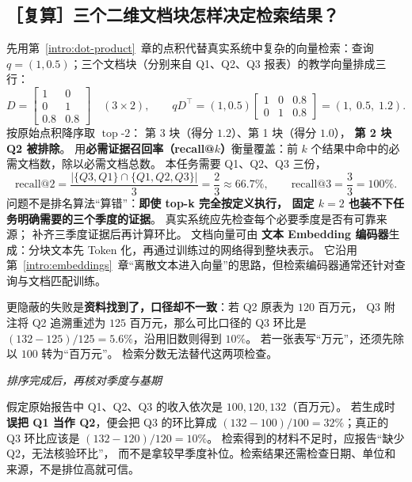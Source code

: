 \subsection{［复算］三个二维文档块怎样决定检索结果？}
\label{concept:vector-retrieval}

先用第~\ref*{intro:dot-product}~章的点积代替真实系统中复杂的向量检索：查询
$q=(1,0.5)$；三个文档块（分别来自 Q1、Q2、Q3 报表）的教学向量排成三行：
\[
D=\begin{bmatrix}1&0\\0&1\\0.8&0.8\end{bmatrix}
\quad(3\times2),\qquad
qD^\top
=(1,0.5)
\begin{bmatrix}1&0&0.8\\0&1&0.8\end{bmatrix}
=\boxed{(1,\;0.5,\;1.2)}.
\]
按原始点积降序取 $\operatorname{top}\text{-}2$：
第 3 块（得分 $1.2$）、第 1 块（得分 $1.0$），
\textbf{第 2 块 Q2 被排除}。
\label{concept:recall-at-k}%
用\textbf{必需证据召回率（recall@$k$）}衡量覆盖：前 $k$ 个结果中命中的必需文档数，除以必需文档总数。
本任务需要 Q1、Q2、Q3 三份，
\[
\text{recall@}2=\frac{|\{Q3,Q1\}\cap\{Q1,Q2,Q3\}|}{3}=\frac23\approx\boxed{66.7\%},\qquad
\text{recall@}3=\frac33=100\%.
\]
问题不是排名算法“算错”：\textbf{即使 top-k 完全按定义执行，
固定 $k=2$ 也装不下任务明确需要的三个季度的证据}。
真实系统应先检查每个必要季度是否有可靠来源；
补齐三季度证据后再计算环比。
文档向量可由
\textbf{文本 Embedding 编码器}生成：分块文本先 Token 化，再通过训练过的网络得到整块表示。
它沿用第~\ref*{intro:embeddings}~章“离散文本进入向量”的思路，但检索编码器通常还针对查询与文档匹配训练。

更隐蔽的失败是\textbf{资料找到了，口径却不一致}：若 Q2 原表为 $120$ 百万元，
Q3 附注将 Q2 追溯重述为 $125$ 百万元，那么可比口径的 Q3 环比是
$(132-125)/125=5.6\%$，沿用旧数则得到 $10\%$。
若一张表写“万元”，还须先除以 $100$ 转为“百万元”。
检索分数无法替代这两项检查。

\begin{example}
\noindent\emph{排序完成后，再核对季度与基期}\par
假定原始报告中 Q1、Q2、Q3 的收入依次是 $100,120,132$（百万元）。
若生成时\textbf{误把 Q1 当作 Q2}，便会把 Q3 的环比算成
$(132-100)/100=\boxed{32\%}$；真正的 Q3 环比应该是
$(132-120)/120=\boxed{10\%}$。
检索得到的材料不足时，应报告“缺少 Q2，无法核验环比”，
而不是拿较早季度补位。检索结果还需检查日期、单位和来源，不是排位高就可信。
\end{example}

